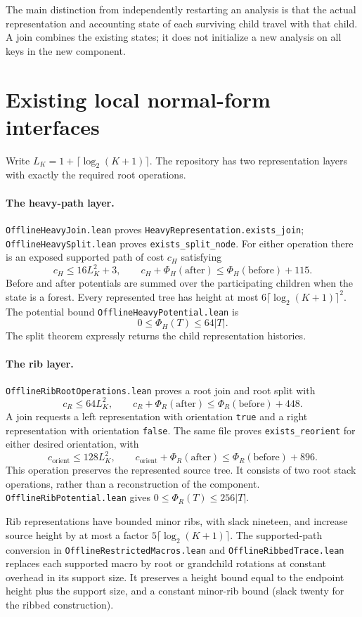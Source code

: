 \documentclass[11pt]{article}
\begin{document}
The main distinction from independently restarting an analysis is that
the actual representation and accounting state of each surviving child
travel with that child. A join combines the existing states; it does
not initialize a new analysis on all keys in the new component.

\section{Existing local normal-form interfaces}

Write $L_K=1+\lceil\log_2(K+1)\rceil$. The repository has two
representation layers with exactly the required root operations.

\paragraph{The heavy-path layer.}
\texttt{OfflineHeavyJoin.lean} proves
\texttt{HeavyRepresentation.exists\_join};
\texttt{OfflineHeavySplit.lean} proves
\texttt{exists\_split\_node}. For either operation there is an exposed
supported path of cost $c_H$ satisfying
\[
 c_H\le 16L_K^2+3,
 \qquad
 c_H+\Phi_H(\text{after})
 \le\Phi_H(\text{before})+115.
\]
Before and after potentials are summed over the participating children
when the state is a forest. Every represented tree has height at most
$6\lceil\log_2(K+1)\rceil^2$. The potential bound
\texttt{OfflineHeavyPotential.lean} is
\[
 0\le\Phi_H(T)\le64|T|.
\]
The split theorem expressly returns the child representation histories.

\paragraph{The rib layer.}
\texttt{OfflineRibRootOperations.lean} proves a root join and root
split with
\[
 c_R\le64L_K^2,
 \qquad
 c_R+\Phi_R(\text{after})
 \le\Phi_R(\text{before})+448.
\]
A join requests a left representation with orientation \texttt{true}
and a right representation with orientation \texttt{false}.
The same file proves \texttt{exists\_reorient} for either desired
orientation, with
\[
 c_{\mathrm{orient}}\le128L_K^2,
 \qquad
 c_{\mathrm{orient}}+\Phi_R(\text{after})
 \le\Phi_R(\text{before})+896.
\]
This operation preserves the represented source tree. It consists of
two root stack operations, rather than a reconstruction of the component.
\texttt{OfflineRibPotential.lean} gives
$0\le\Phi_R(T)\le256|T|$.

Rib representations have bounded minor ribs, with slack nineteen, and
increase source height by at most a factor
$5\lceil\log_2(K+1)\rceil$.
The supported-path conversion in
\texttt{OfflineRestrictedMacros.lean} and
\texttt{OfflineRibbedTrace.lean} replaces each supported macro by
root or grandchild rotations at constant overhead in its support size.
It preserves a height bound equal to the endpoint height plus the
support size, and a constant minor-rib bound (slack twenty for the
ribbed construction).
\end{document}
